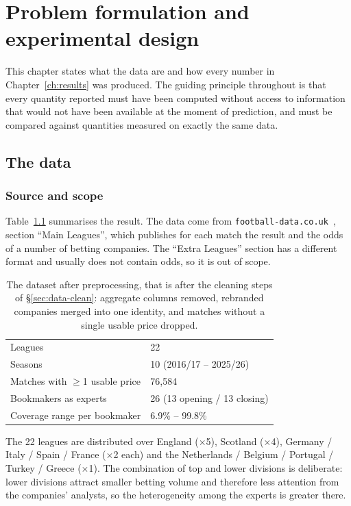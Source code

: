\documentclass[12pt,a4paper,oneside]{report}
\newcommand{\file}[1]{\texttt{#1}}
\renewcommand{\_}{\oldunderscore\allowbreak}
\theoremstyle{definition}
\theoremstyle{plain}
\theoremstyle{definition}   %
\begin{document}
\chapter{Problem formulation and experimental design}
\label{ch:data}

This chapter states what the data are and how every number in Chapter~\ref{ch:results} was
produced. The guiding principle throughout is that every quantity reported must have been
computed without access to information that would not have been available at the moment of
prediction, and must be compared against quantities measured on exactly the same data.

\section{The data}

\subsection{Source and scope}

Table~\ref{tab:dataset} summarises the result. The data come from \file{football-data.co.uk}~\cite{footballdata}, section ``Main Leagues'', which publishes for each
match the result and the odds of a number of betting companies. The ``Extra Leagues'' section has
a different format and usually does not contain odds, so it is out of scope.

\begin{table}[H]
\centering
\begin{tabular}{@{}ll@{}}
\toprule
Leagues & 22 \\
Seasons & 10 (2016/17 -- 2025/26) \\
Matches with $\geq$1 usable price & 76,584 \\
Bookmakers as experts & 26 (13 opening / 13 closing) \\
Coverage range per bookmaker & 6.9\% -- 99.8\% \\
\bottomrule
\end{tabular}
\caption{The dataset after preprocessing, that is after the cleaning steps of
\S\ref{sec:data-clean}: aggregate columns removed, rebranded companies merged into one
identity, and matches without a single usable price dropped.}
\label{tab:dataset}
\end{table}

The 22 leagues are distributed over England ($\times$5), Scotland ($\times$4),
Germany / Italy / Spain / France ($\times$2 each) and the Netherlands / Belgium /
Portugal / Turkey / Greece ($\times$1). The combination of top and lower divisions is
deliberate: lower divisions attract smaller betting volume and therefore less attention from the
companies' analysts, so the heterogeneity among the experts is greater there.
\end{document}
